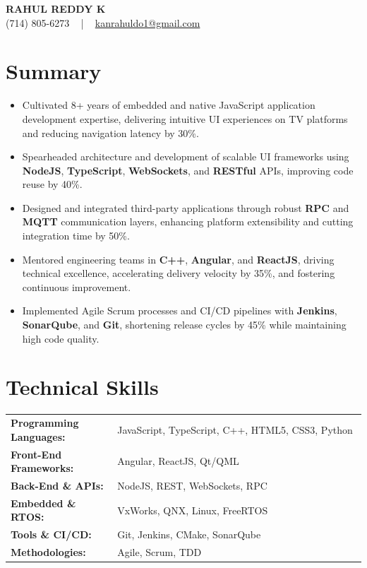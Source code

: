 \documentclass[letterpaper,11pt]{article}
\newcommand{\resumeItem}[1]{
  \item\footnotesize{
    {#1 \vspace{-2pt}}
  }
}
\newcommand{\resumeItemListStart}{\begin{itemize}[leftmargin=*]}
\newcommand{\resumeItemListEnd}{\end{itemize}\vspace{-5pt}}
\begin{document}
\begin{center}
    {\fontsize{14pt}{12pt}\selectfont \textbf{\MakeUppercase{Rahul Reddy K}}}\\ \vspace{2pt}
    \fontsize{10pt}{12pt}\selectfont (714) 805-6273 ~ | ~ \href{mailto:kanrahuldo1@gmail.com}{kanrahuldo1@gmail.com}~
    \vspace{-8pt}
\end{center}

\section{Summary}
\fontsize{9pt}{10pt}\selectfont
\resumeItemListStart
    \resumeItem{Cultivated 8+ years of embedded and native JavaScript application development expertise, delivering intuitive UI experiences on TV platforms and reducing navigation latency by 30\%.}
    \resumeItem{Spearheaded architecture and development of scalable UI frameworks using \textbf{NodeJS}, \textbf{TypeScript}, \textbf{WebSockets}, and \textbf{RESTful} APIs, improving code reuse by 40\%.}
    \resumeItem{Designed and integrated third-party applications through robust \textbf{RPC} and \textbf{MQTT} communication layers, enhancing platform extensibility and cutting integration time by 50\%.}
    \resumeItem{Mentored engineering teams in \textbf{C++}, \textbf{Angular}, and \textbf{ReactJS}, driving technical excellence, accelerating delivery velocity by 35\%, and fostering continuous improvement.}
    \resumeItem{Implemented Agile Scrum processes and CI/CD pipelines with \textbf{Jenkins}, \textbf{SonarQube}, and \textbf{Git}, shortening release cycles by 45\% while maintaining high code quality.}
\resumeItemListEnd
\vspace{-6pt}

\section{Technical Skills}
        \vspace{-14pt}
        \begin{table}[h]
            \fontsize{9pt}{10pt}\selectfont
            \begin{tabular}{p{0.3\linewidth} p{0.7\linewidth}}
                \textbf{Programming Languages:} & JavaScript, TypeScript, C++, HTML5, CSS3, Python \\
                \textbf{Front-End Frameworks:} & Angular, ReactJS, Qt/QML \\
                \textbf{Back-End \& APIs:} & NodeJS, REST, WebSockets, RPC \\
                \textbf{Embedded \& RTOS:} & VxWorks, QNX, Linux, FreeRTOS \\
                \textbf{Tools \& CI/CD:} & Git, Jenkins, CMake, SonarQube \\
                \textbf{Methodologies:} & Agile, Scrum, TDD \\
            \end{tabular}
        \end{table}
    \vspace{-15pt}
\end{document}
